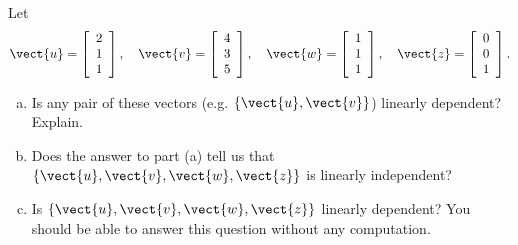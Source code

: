 \begin{example} Let
    \[
    \vect{u} = \left[\begin{array}{l}
    2 \\
    1 \\
    1
    \end{array}\right], \quad \vect{v} = \left[\begin{array}{l}
    4 \\
    3 \\
    5
    \end{array}\right], \quad \vect{w} = \left[\begin{array}{l}
    1 \\
    1 \\
    1
    \end{array}\right], \quad \vect{z} = \left[\begin{array}{l}
    0 \\
    0 \\
    1
    \end{array}\right].
    \]

    \begin{enumerate}[(a)]
        \item Is any pair of these vectors (e.g. $\{\vect{u}, \vect{v}\}$) linearly dependent? Explain.
        \item Does the answer to part (a) tell us that $\{\vect{u}, \vect{v}, \vect{w}, \vect{z}\}$ is linearly independent?
        \item Is $\{\vect{u}, \vect{v}, \vect{w}, \vect{z}\}$ linearly dependent? You should be able to answer this question without any computation.
    \end{enumerate}
\end{example}

